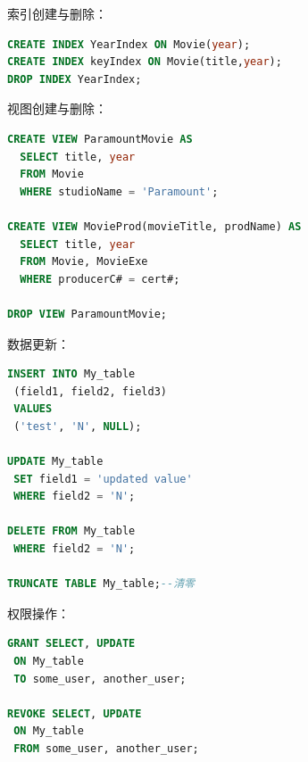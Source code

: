索引创建与删除：
\begin{lstlisting}[language=SQL]
CREATE INDEX YearIndex ON Movie(year);
CREATE INDEX keyIndex ON Movie(title,year);
DROP INDEX YearIndex;
\end{lstlisting}

视图创建与删除：
\begin{lstlisting}[language=SQL]
CREATE VIEW ParamountMovie AS
  SELECT title, year
  FROM Movie
  WHERE studioName = 'Paramount';
  
CREATE VIEW MovieProd(movieTitle, prodName) AS
  SELECT title, year
  FROM Movie, MovieExe
  WHERE producerC# = cert#;
  
DROP VIEW ParamountMovie;
\end{lstlisting}

数据更新：
\begin{lstlisting}[language=SQL]
INSERT INTO My_table
 (field1, field2, field3)
 VALUES
 ('test', 'N', NULL);

UPDATE My_table
 SET field1 = 'updated value'
 WHERE field2 = 'N';

DELETE FROM My_table
 WHERE field2 = 'N';
 
TRUNCATE TABLE My_table;--清零
\end{lstlisting}

权限操作：
\begin{lstlisting}[language=SQL]
GRANT SELECT, UPDATE
 ON My_table
 TO some_user, another_user;
 
REVOKE SELECT, UPDATE
 ON My_table
 FROM some_user, another_user;
\end{lstlisting}

